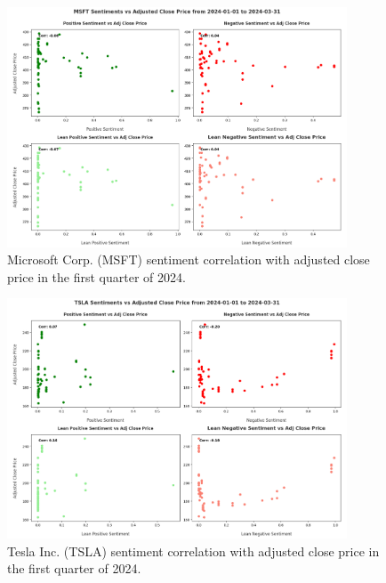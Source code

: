 \begin{figure}[htbp]
  \centering
  \includegraphics[width=0.9\textwidth]{img/experiment-stock/msft-corr-a.pdf}
  \caption{Microsoft Corp. (MSFT) sentiment correlation with adjusted close price in the first quarter of 2024.}
  \label{fig:elsa-experiment-stock-msft-corr}
\end{figure}

\begin{figure}[ht]
  \centering
  \includegraphics[width=0.9\textwidth]{img/experiment-stock/tsla-corr-a.pdf}
  \caption{Tesla Inc. (TSLA) sentiment correlation with adjusted close price in the first quarter of 2024.}
  \label{fig:elsa-experiment-stock-tsla-corr}
\end{figure}
